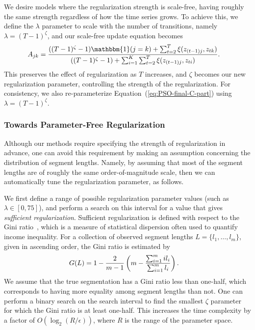 \documentclass[letterpaper]{article}
\begin{document}
We desire models where the regularization strength is scale-free, having roughly the same strength regardless of how the time series grows. To achieve this, we define the $\lambda$ parameter to scale with the number of transitions, namely $\lambda = (T-1)^\zeta$, and our scale-free update equation becomes
\begin{align}\label{eq:SCALE-FREE-MAP}
  \setlength{\abovedisplayskip}{0pt}
  \setlength{\belowdisplayskip}{0pt}
    A_{jk} &= \frac{((T - 1)^{\zeta}-1){\mathbbm{1}(j = k)} + \sum_{t=2}^{T} \xi(z_{(t-1)j}, z_{tk})}   
    {((T - 1)^{\zeta} - 1) + \sum_{i=1}^{K}\sum_{t=2}^{T} \xi(z_{(t-1)j}, z_{ti})}.
\end{align}
This preserves the effect of regularization as $T$ increases, and $\zeta$
becomes our new regularization parameter, controlling the strength of the
regularization. For consistency, we also re-parameterize
Equation~(\ref{eq:PSO-final-C-part}) using $\lambda = (T-1)^\zeta$.

\subsubsection{Towards Parameter-Free Regularization}\label{sec:param-free}

Although our methods require specifying the strength of regularization in advance, one can avoid this requirement by making an assumption concerning the distribution of segment lengths. Namely, by assuming that most of the segment lengths are of roughly the same order-of-magnitude scale, then we can automatically tune the regularization parameter, as follows.

We first define a range of possible regularization parameter values (such as
$\lambda \in [0, 75]$), and perform a search on this interval for a value that
gives \emph{sufficient regularization}. Sufficient regularization is defined
with respect to the Gini ratio~\cite{gini1936,wiki:1}, which is a measure of
statistical dispersion often used to quantify income inequality. For a
collection of observed segment lengths $L = \{l_1, \ldots, l_m\}$, given in
ascending order, the Gini ratio is estimated by
\begin{align*}
  \setlength{\abovedisplayskip}{0pt}
  \setlength{\belowdisplayskip}{0pt}
    G(L) &= 1 - \frac{2}{m-1}\left(m - \frac{\sum_{i=1}^{m} i l_i}{\sum_{i=1}^{m} l_i}\right).
\end{align*}
We assume that the true segmentation has a Gini ratio less than
one-half, which corresponds to having more equality among segment lengths than
not. One can perform a binary search on the search interval to find the smallest
$\zeta$ parameter for which the Gini ratio is at least one-half. This increases
the time complexity by a factor of $O(\log_2 (R / \epsilon))$, where $R$ is the
range of the parameter space.
\end{document}
